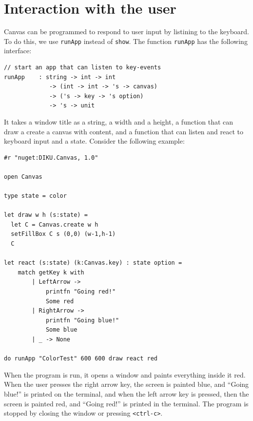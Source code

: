 \documentclass{article}
\begin{document}
\section{Interaction with the user}
Canvas can be programmed to respond to user input by listining to the keyboard. To do this, we use \lstinline{runApp} instead of \lstinline{show}. The function \lstinline{runApp} has the following interface:
\begin{lstlisting}
// start an app that can listen to key-events
runApp    : string -> int -> int
             -> (int -> int -> 's -> canvas)
             -> ('s -> key -> 's option)
             -> 's -> unit
\end{lstlisting}
It takes a window title as a string, a width and a height, a function that can draw a create a canvas with content, and a function that can listen and react to keyboard input and a state. Consider the following example:
\begin{lstlisting}
#r "nuget:DIKU.Canvas, 1.0"

open Canvas

type state = color

let draw w h (s:state) =
  let C = Canvas.create w h
  setFillBox C s (0,0) (w-1,h-1)
  C

let react (s:state) (k:Canvas.key) : state option =
    match getKey k with
        | LeftArrow ->
            printfn "Going red!"
            Some red
        | RightArrow ->
            printfn "Going blue!"
            Some blue
        | _ -> None

do runApp "ColorTest" 600 600 draw react red
\end{lstlisting}
When the program is run, it opens a window and paints everything inside it red. When the user presses the right arrow key, the screen is painted blue, and ``Going blue!'' is printed on the terminal, and when the left arrow key is pressed, then the screen is painted red, and ``Going red!'' is printed in the terminal. The program is stopped by closing the window or pressing \texttt{<ctrl-c>}.
\end{document}
